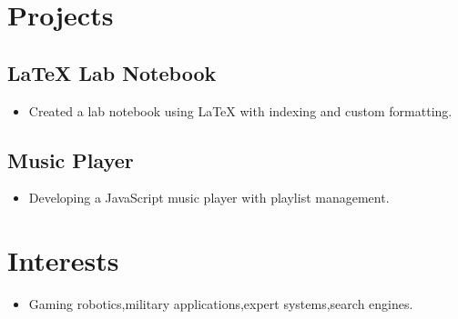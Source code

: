 \documentclass{article}
\begin{document}
\section*{Projects}
\subsection*{LaTeX Lab Notebook}
\begin{itemize}[leftmargin=0.5cm]
    \item Created a lab notebook using LaTeX with indexing and custom formatting.
\end{itemize}

\subsection*{Music Player}
\begin{itemize}[leftmargin=0.5cm]
    \item Developing a JavaScript music player with playlist management.
\end{itemize}


\section*{Interests}
\begin{itemize}[leftmargin=0.5cm]
    \item Gaming robotics,military applications,expert systems,search engines.
\end{itemize}
\end{document}
